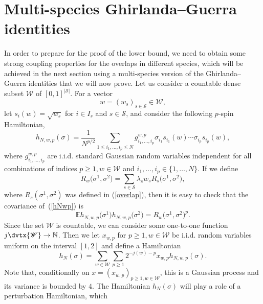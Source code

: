 \documentclass[aop,MSNbibl,dvips]{arximspdf}
\def\cal{\mathscr}
\newcommand{\spe}{{\cal S}}
\newcommand{\WW}{{\cal W}}
\newcommand{\e}{\mathbb{E}}
\newcommand{\Natural}{\mathbb{N}}
\begin{document}
\section{Multi-species Ghirlanda--Guerra identities} \label{Sec3label}

In order to prepare for the proof of the lower bound, we need to obtain
some strong coupling properties for the overlaps in different species,
which will be achieved in the next section using a multi-species
version of the Ghirlanda--Guerra identities that we will now prove. Let
us consider a countable dense subset $\WW$ of $[0,1]^{|\spe|}$. For a vector
%
\begin{equation}
w=(w_s)_{s\in\spe} \in\WW,
\end{equation}
%
let $s_i(w)=\sqrt{w_s}$ for $i\in I_s$ and $s\in\spe$, and consider the
following $p$-spin Hamiltonian,
%
\begin{equation}
h_{N,w,p}(\sigma) = \frac{1}{N^{p/2}} \sum_{1\leq i_1,\ldots,
i_p\leq
N}
g_{i_1,\ldots, i_p}^{w,p} \sigma_{i_1}s_{i_1}(w) \cdots
\sigma _{i_p}s_{i_p}(w), \label{hNwp}
\end{equation}
%
where $g_{i_1,\ldots, i_p}^{w,p}$ are i.i.d. standard Gaussian random
variables independent for all combinations of indices $p\geq1,w\in\WW
$ and $i_1,\ldots, i_p\in\{1,\ldots, N\}$. If we define
%
\begin{equation}
R_w \bigl(\sigma^1,\sigma^2 \bigr) = \sum
_{s\in\spe} \lambda_s w_s
R_s \bigl(\sigma^1,\sigma^2 \bigr),
\label{Rw}
\end{equation}
%
where $R_s(\sigma^1,\sigma^2)$ was defined in (\ref{overlap}), then it
is easy to check that the covariance of~(\ref{hNwp}) is
%
\begin{equation}
\e h_{N,w,p}\bigl(\sigma^1\bigr)h_{N,w,p}\bigl(
\sigma^2\bigr) = R_w \bigl(\sigma^1,
\sigma^2 \bigr)^p. \label{CovhNpw}
\end{equation}
%
Since the set $\WW$ is countable, we can consider some one-to-one
function \mbox{$j\dvtx \WW\to\Natural$}. Then we let $x_{w,p}$ for $p\geq1,w\in
\WW
$ be i.i.d. random variables uniform on the interval $[1,2]$ and define
a Hamiltonian
%
\begin{equation}
h_{N}(\sigma) = \sum_{w\in\WW} \sum
_{p\geq1} 2^{-j(w)-p} x_{w,p} h_{N,w,p}(
\sigma). \label{hNw}
\end{equation}
%
Note that, conditionally on $x=(x_{w,p})_{p\geq1,w\in\WW}$, this is a
Gaussian process and its variance is bounded by $4$. The Hamiltonian
$h_N(\sigma)$ will play a role of a perturbation Hamiltonian, which
\end{document}
